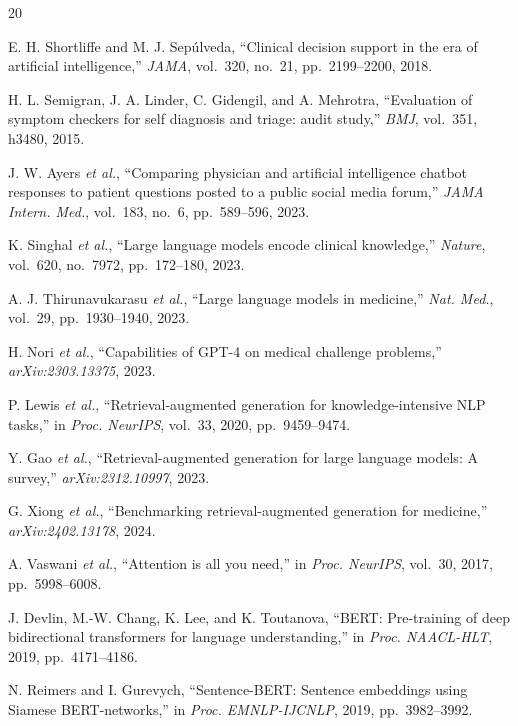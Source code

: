 \documentclass[conference]{IEEEtran}
\begin{document}
\begin{thebibliography}{20}
\footnotesize

E. H. Shortliffe and M. J. Sep\'{u}lveda, ``Clinical decision support in the
era of artificial intelligence,'' \textit{JAMA}, vol.~320, no.~21,
pp.~2199--2200, 2018.

H. L. Semigran, J. A. Linder, C. Gidengil, and A. Mehrotra, ``Evaluation of
symptom checkers for self diagnosis and triage: audit study,''
\textit{BMJ}, vol.~351, h3480, 2015.

J. W. Ayers \textit{et al.}, ``Comparing physician and artificial
intelligence chatbot responses to patient questions posted to a public social
media forum,'' \textit{JAMA Intern. Med.}, vol.~183, no.~6, pp.~589--596,
2023.

K. Singhal \textit{et al.}, ``Large language models encode clinical
knowledge,'' \textit{Nature}, vol.~620, no.~7972, pp.~172--180, 2023.

A. J. Thirunavukarasu \textit{et al.}, ``Large language models in medicine,''
\textit{Nat. Med.}, vol.~29, pp.~1930--1940, 2023.

H. Nori \textit{et al.}, ``Capabilities of GPT-4 on medical challenge
problems,'' \textit{arXiv:2303.13375}, 2023.

P. Lewis \textit{et al.}, ``Retrieval-augmented generation for
knowledge-intensive NLP tasks,'' in \textit{Proc. NeurIPS}, vol.~33, 2020,
pp.~9459--9474.

Y. Gao \textit{et al.}, ``Retrieval-augmented generation for large language
models: A survey,'' \textit{arXiv:2312.10997}, 2023.

G. Xiong \textit{et al.}, ``Benchmarking retrieval-augmented generation for
medicine,'' \textit{arXiv:2402.13178}, 2024.

A. Vaswani \textit{et al.}, ``Attention is all you need,'' in \textit{Proc.
NeurIPS}, vol.~30, 2017, pp.~5998--6008.

J. Devlin, M.-W. Chang, K. Lee, and K. Toutanova, ``BERT: Pre-training of
deep bidirectional transformers for language understanding,'' in
\textit{Proc. NAACL-HLT}, 2019, pp.~4171--4186.

N. Reimers and I. Gurevych, ``Sentence-BERT: Sentence embeddings using
Siamese BERT-networks,'' in \textit{Proc. EMNLP-IJCNLP}, 2019,
pp.~3982--3992.


\end{thebibliography}
\end{document}
